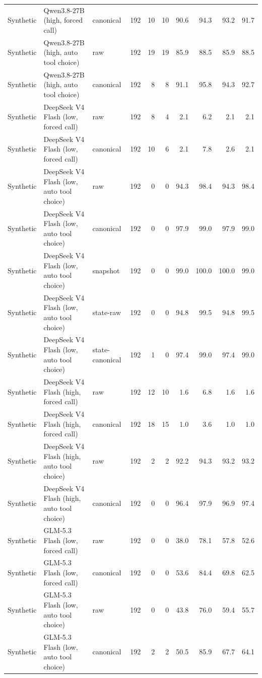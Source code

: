 {\begin{longtable}{lllrrrrrrr}
Synthetic & Qwen3.8-27B (high, forced call) & canonical & 192 & 10 & 10 & 90.6 & 94.3 & 93.2 & 91.7 \\
Synthetic & Qwen3.8-27B (high, auto tool choice) & raw & 192 & 19 & 19 & 85.9 & 88.5 & 85.9 & 88.5 \\
Synthetic & Qwen3.8-27B (high, auto tool choice) & canonical & 192 & 8 & 8 & 91.1 & 95.8 & 94.3 & 92.7 \\
Synthetic & DeepSeek V4 Flash (low, forced call) & raw & 192 & 8 & 4 & 2.1 & 6.2 & 2.1 & 2.1 \\
Synthetic & DeepSeek V4 Flash (low, forced call) & canonical & 192 & 10 & 6 & 2.1 & 7.8 & 2.6 & 2.1 \\
Synthetic & DeepSeek V4 Flash (low, auto tool choice) & raw & 192 & 0 & 0 & 94.3 & 98.4 & 94.3 & 98.4 \\
Synthetic & DeepSeek V4 Flash (low, auto tool choice) & canonical & 192 & 0 & 0 & 97.9 & 99.0 & 97.9 & 99.0 \\
Synthetic & DeepSeek V4 Flash (low, auto tool choice) & snapshot & 192 & 0 & 0 & 99.0 & 100.0 & 100.0 & 99.0 \\
Synthetic & DeepSeek V4 Flash (low, auto tool choice) & state-raw & 192 & 0 & 0 & 94.8 & 99.5 & 94.8 & 99.5 \\
Synthetic & DeepSeek V4 Flash (low, auto tool choice) & state-canonical & 192 & 1 & 0 & 97.4 & 99.0 & 97.4 & 99.0 \\
Synthetic & DeepSeek V4 Flash (high, forced call) & raw & 192 & 12 & 10 & 1.6 & 6.8 & 1.6 & 1.6 \\
Synthetic & DeepSeek V4 Flash (high, forced call) & canonical & 192 & 18 & 15 & 1.0 & 3.6 & 1.0 & 1.0 \\
Synthetic & DeepSeek V4 Flash (high, auto tool choice) & raw & 192 & 2 & 2 & 92.2 & 94.3 & 93.2 & 93.2 \\
Synthetic & DeepSeek V4 Flash (high, auto tool choice) & canonical & 192 & 0 & 0 & 96.4 & 97.9 & 96.9 & 97.4 \\
Synthetic & GLM-5.3 Flash (low, forced call) & raw & 192 & 0 & 0 & 38.0 & 78.1 & 57.8 & 52.6 \\
Synthetic & GLM-5.3 Flash (low, forced call) & canonical & 192 & 0 & 0 & 53.6 & 84.4 & 69.8 & 62.5 \\
Synthetic & GLM-5.3 Flash (low, auto tool choice) & raw & 192 & 0 & 0 & 43.8 & 76.0 & 59.4 & 55.7 \\
Synthetic & GLM-5.3 Flash (low, auto tool choice) & canonical & 192 & 2 & 2 & 50.5 & 85.9 & 67.7 & 64.1 \\

\end{longtable}}
